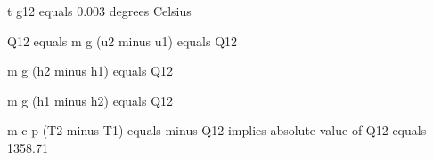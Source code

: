 t g12 equals 0.003 degrees Celsius

Q12 equals m g (u2 minus u1) equals Q12

m g (h2 minus h1) equals Q12

m g (h1 minus h2) equals Q12

m c p (T2 minus T1) equals minus Q12 implies absolute value of Q12 equals 1358.71